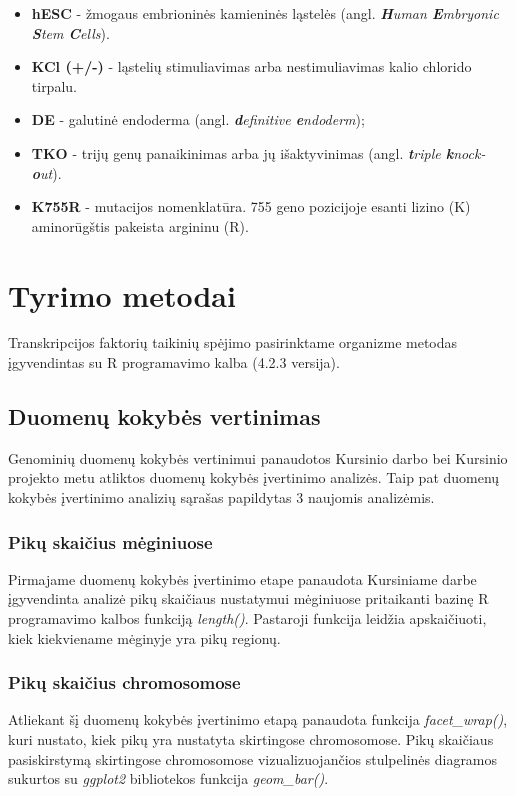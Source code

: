 \documentclass[12pt]{article}
\begin{document}
\begin{itemize}
    \item \textbf{hESC} - žmogaus embrioninės kamieninės ląstelės
          (angl. \emph{\textbf{H}uman \textbf{E}mbryonic \textbf{S}tem
          \textbf{C}ells}).
    \item \textbf{KCl (+/-)} - ląstelių stimuliavimas arba nestimuliavimas kalio
          chlorido tirpalu.
    \item \textbf{DE} - galutinė endoderma (angl. \emph{\textbf{d}efinitive
          \textbf{e}ndoderm});
    \item \textbf{TKO} - trijų genų panaikinimas arba jų išaktyvinimas
          (angl. \emph{\textbf{t}riple \textbf{k}nock-\textbf{o}ut}).
    \item \textbf{K755R} - mutacijos nomenklatūra. 755 geno pozicijoje esanti
          lizino (K) aminorūgštis pakeista argininu (R).
\end{itemize}

\newpage


\section{Tyrimo metodai}
Transkripcijos faktorių taikinių spėjimo pasirinktame organizme metodas
įgyvendintas su R programavimo kalba\cite{R} (4.2.3 versija).

\subsection{Duomenų kokybės vertinimas}
Genominių duomenų kokybės vertinimui panaudotos Kursinio darbo bei Kursinio
projekto metu atliktos duomenų kokybės įvertinimo analizės. Taip pat
duomenų kokybės įvertinimo analizių sąrašas papildytas 3 naujomis analizėmis.

\subsubsection*{Pikų skaičius mėginiuose}
Pirmajame duomenų kokybės įvertinimo etape panaudota Kursiniame darbe
įgyvendinta analizė pikų skaičiaus nustatymui mėginiuose pritaikanti bazinę R
programavimo kalbos funkciją \emph{length()}. Pastaroji funkcija leidžia
apskaičiuoti, kiek kiekviename mėginyje yra pikų regionų.

\subsubsection*{Pikų skaičius chromosomose}
Atliekant šį duomenų kokybės įvertinimo etapą panaudota funkcija
\emph{facet\_wrap()}, kuri nustato, kiek pikų yra nustatyta skirtingose
chromosomose. Pikų skaičiaus pasiskirstymą skirtingose chromosomose
vizualizuojančios stulpelinės diagramos sukurtos su \emph{ggplot2}\cite{GGPLOT2}
bibliotekos funkcija \emph{geom\_bar()}.
\end{document}

